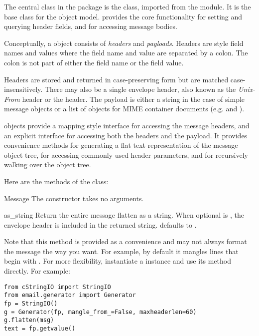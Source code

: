 
The central class in the  package is the
 class, imported from the  module.  It is
the base class for the  object model.   provides
the core functionality for setting and querying header fields, and for
accessing message bodies.

Conceptually, a  object consists of \emph{headers} and
\emph{payloads}.  Headers are  style field names and
values where the field name and value are separated by a colon.  The
colon is not part of either the field name or the field value.

Headers are stored and returned in case-preserving form but are
matched case-insensitively.  There may also be a single envelope
header, also known as the \emph{Unix-From} header or the
 header.  The payload is either a string in the case of
simple message objects or a list of  objects for
MIME container documents (e.g.  and
).

 objects provide a mapping style interface for
accessing the message headers, and an explicit interface for accessing
both the headers and the payload.  It provides convenience methods for
generating a flat text representation of the message object tree, for
accessing commonly used header parameters, and for recursively walking
over the object tree.

Here are the methods of the  class:

\begin{classdesc}{Message}{}
The constructor takes no arguments.
\end{classdesc}

\begin{methoddesc}[Message]{as_string}{}
Return the entire message flatten as a string.  When optional
 is , the envelope header is included in the
returned string.   defaults to .

Note that this method is provided as a convenience and may not always format
the message the way you want.  For example, by default it mangles lines that
begin with .  For more flexibility, instantiate a
 instance and use its
 method directly.  For example:

\begin{verbatim}
from cStringIO import StringIO
from email.generator import Generator
fp = StringIO()
g = Generator(fp, mangle_from_=False, maxheaderlen=60)
g.flatten(msg)
text = fp.getvalue()
\end{verbatim}
\end{methoddesc}

